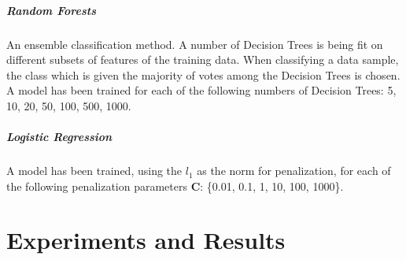 \documentclass{article}
\begin{document}
\subparagraph{Random Forests}
An ensemble classification method. A number of Decision Trees is being fit on different subsets of features of the training data. When classifying a data sample, the class which is given the majority of votes among the Decision Trees is chosen. A model has been trained for each of the following numbers of Decision Trees: 5, 10, 20, 50, 100, 500, 1000.

\subparagraph{Logistic Regression}
A model has been trained, using the $l_1$ as the norm for penalization, for each of the following penalization parameters \textbf{C}: \{0.01, 0.1, 1, 10, 100, 1000\}.

\section{Experiments and Results}
\end{document}
